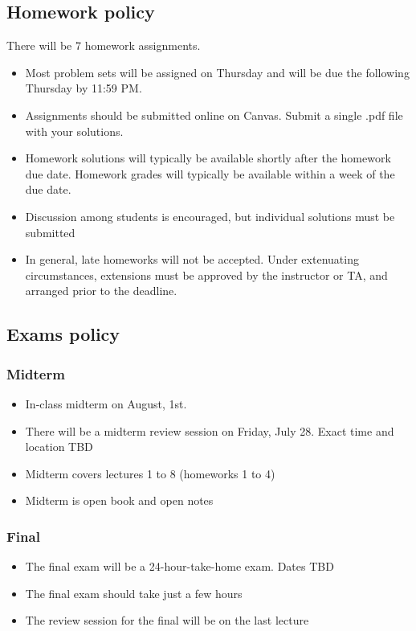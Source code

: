 \documentclass[10pt]{article}
\begin{document}
\subsection*{Homework policy}

There will be 7 homework assignments.
\begin{itemize}
	\item Most problem sets will be assigned on Thursday and will be due the following Thursday by 11:59 PM.
	\item Assignments should be submitted online on Canvas. Submit a single .pdf file with your solutions. 
	\item Homework solutions will typically be available shortly after the homework due date. Homework grades will typically be available within a week of the due date.
	\item Discussion among students is encouraged, but individual solutions must be submitted
	\item In general, late homeworks will not be accepted. Under extenuating circumstances, extensions must be approved by the instructor or TA, and arranged prior to the deadline.
\end{itemize}

\subsection*{Exams policy}
\subsubsection*{Midterm}
\begin{itemize}
	\item In-class midterm on August, 1st. 
	\item There will be a midterm review session on Friday, July 28. Exact time and location TBD
	\item Midterm covers lectures 1 to 8 (homeworks 1 to 4)
	\item Midterm is open book and open notes
\end{itemize}

\subsubsection*{Final}
\begin{itemize}
	\item The final exam will be a 24-hour-take-home exam. Dates TBD
	\item The final exam should take just a few hours
	\item The review session for the final will be on the last lecture
\end{itemize}
\end{document}
